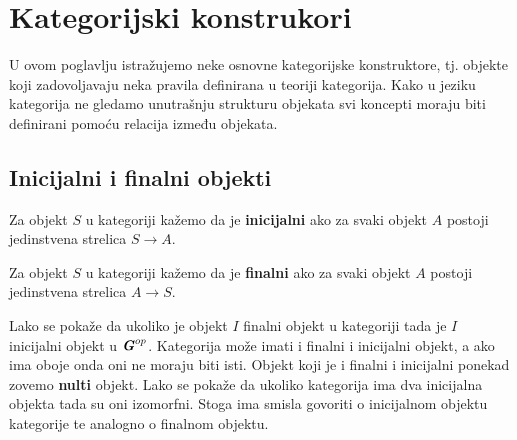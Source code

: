   \section{Kategorijski konstrukori}
  U ovom poglavlju istražujemo neke osnovne kategorijske
  konstruktore, tj. objekte koji zadovoljavaju neka pravila definirana u teoriji
  kategorija. Kako u jeziku kategorija ne gledamo unutrašnju strukturu objekata
  svi koncepti moraju biti definirani pomoću relacija između objekata.
  \subsection{Inicijalni i finalni objekti}
  \begin{definition}
    Za objekt $S$ u kategoriji  kažemo da je \textbf{inicijalni} ako za svaki
    objekt $A$ postoji jedinstvena strelica $S \xrightarrow{} A$.
  \end{definition}
  \begin{definition}
    Za objekt $S$ u kategoriji  kažemo da je \textbf{finalni} ako za svaki
    objekt $A$ postoji jedinstvena strelica $A \xrightarrow{} S$.
  \end{definition}
  Lako se pokaže da ukoliko je objekt $I$ finalni objekt u kategoriji  tada je $I$ inicijalni objekt u $\textbf{\emph{G}}^{op}$.
  Kategorija  može imati i finalni i inicijalni objekt, a ako ima
  oboje onda oni ne moraju biti isti. Objekt koji je i finalni i inicijalni ponekad
  zovemo \textbf{nulti} objekt. Lako se pokaže da ukoliko kategorija ima dva inicijalna
  objekta tada su oni izomorfni. Stoga ima smisla govoriti o inicijalnom objektu
  kategorije te analogno o finalnom objektu.
